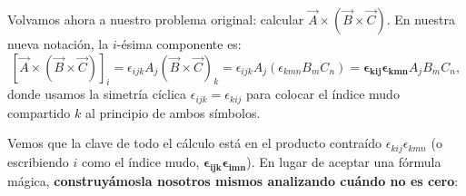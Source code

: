 \documentclass[11pt,letterpaper]{article}
\begin{document}

Volvamos ahora a nuestro problema original: calcular $\vec{A} \times (\vec{B} \times \vec{C})$. En nuestra nueva notación, la $i$-ésima componente es:
\[
[\vec{A} \times (\vec{B} \times \vec{C})]_i = \epsilon_{ijk} A_j (\vec{B} \times \vec{C})_k = \epsilon_{ijk} A_j (\epsilon_{kmn} B_m C_n) = \mathbf{\epsilon_{kij}\epsilon_{kmn}} A_j B_m C_n,
\]
donde usamos la simetría cíclica $\epsilon_{ijk} = \epsilon_{kij}$ para colocar el índice mudo compartido $k$ al principio de ambos símbolos.

Vemos que la clave de todo el cálculo está en el producto contraído $\epsilon_{kij}\epsilon_{kmn}$ (o escribiendo $i$ como el índice mudo, $\mathbf{\epsilon_{ijk}\epsilon_{imn}}$). En lugar de aceptar una fórmula mágica, \textbf{construyámosla nosotros mismos analizando cuándo no es cero}:
\end{document}
